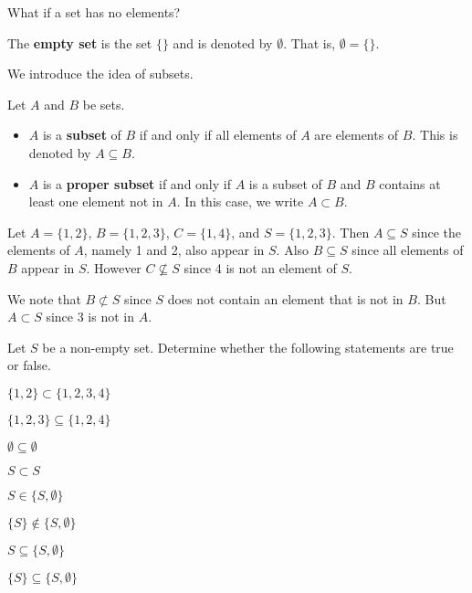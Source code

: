 What if a set has no elements?
\begin{definition}
    The \textbf{empty set} is the set $\{\}$ and is denoted by $\emptyset$. That is, $\emptyset = \{\}$.
\end{definition}

\newpage

We introduce the idea of subsets.
\begin{definition}
    Let $A$ and $B$ be sets.
    \begin{itemize}
        \item $A$ is a \textbf{subset} of $B$ if and only if all elements of $A$ are elements of $B$. This is denoted by $A \subseteq B$.
        \item $A$ is a \textbf{proper subset} if and only if $A$ is a subset of $B$ and $B$ contains at least one element not in $A$. In this case, we write $A \subset B$.
    \end{itemize}
\end{definition}

\begin{example}
    Let $A = \{1, 2\}$, $B = \{1, 2, 3\}$, $C = \{1, 4\}$, and $S = \{1, 2, 3\}$. Then $A \subseteq S$ since the elements of $A$, namely 1 and 2, also appear in $S$. Also $B \subseteq S$ since all elements of $B$ appear in $S$. However $C \not\subseteq S$ since 4 is not an element of $S$.

    We note that $B \not\subset S$ since $S$ does not contain an element that is not in $B$. But $A \subset S$ since 3 is not in $A$.
\end{example}

\begin{exercise}
    Let $S$ be a non-empty set. Determine whether the following statements are true or false.

    \begin{multicols}{2}
        \begin{partquestions}{\alph*}
            \item $\{1, 2\} \subset \{1, 2, 3, 4\}$
            \item $\{1, 2, 3\} \subseteq \{1, 2, 4\}$
            \item $\emptyset \subseteq \emptyset$
            \item $S \subset S$
            \item $S \in \{S, \emptyset\}$
            \item $\{S\} \notin \{S, \emptyset\}$
            \item $S \subseteq \{S, \emptyset\}$
            \item $\{S\} \subseteq \{S, \emptyset\}$
        \end{partquestions}
    \end{multicols}
\end{exercise}

